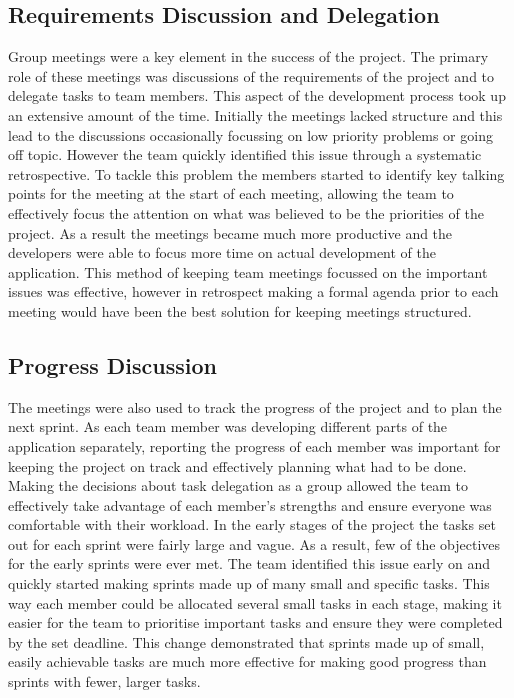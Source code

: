 \documentclass{l3proj}
\begin{document}
\subsection{Requirements Discussion and Delegation}
Group meetings were a key element in the success of the project. The primary role of these meetings was discussions of the requirements of the project and to delegate tasks to team members. This aspect of the development process took up an extensive amount of the time. Initially the meetings lacked structure and this lead to the discussions occasionally focussing on low priority problems or going off topic. However the team quickly identified this issue through a systematic retrospective. To tackle this problem the members started to identify key talking points for the meeting at the start of each meeting, allowing the team to effectively focus the attention on what was believed to be the priorities of the project. As a result the meetings became much more productive and the developers were able to focus more time on actual development of the application. This method of keeping team meetings focussed on the important issues was effective, however in retrospect making a formal agenda prior to each meeting would have been the best solution for keeping meetings structured.

\subsection{Progress Discussion}
The meetings were also used to track the progress of the project and to plan the next sprint. As each team member was developing different parts of the application separately, reporting the progress of each member was important for keeping the project on track and effectively planning what had to be done. Making the decisions about task delegation as a group allowed the team to effectively take advantage of each member's strengths and ensure everyone was comfortable with their workload. In the early stages of the project the tasks set out for each sprint were fairly large and vague. As a result, few of the objectives for the early sprints were ever met. The team identified this issue early on and quickly started making sprints made up of many small and specific tasks. This way each member could be allocated several small tasks in each stage, making it easier for the team to prioritise important tasks and ensure they were completed by the set deadline. This change demonstrated that sprints made up of small, easily achievable tasks are much more effective for making good progress than sprints with fewer, larger tasks.
\end{document}
